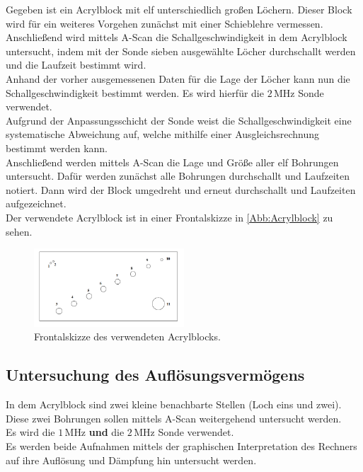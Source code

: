 Gegeben ist ein Acrylblock mit elf unterschiedlich großen Löchern.
Dieser Block wird für ein weiteres Vorgehen zunächst mit einer Schieblehre
vermessen.\\
Anschließend wird mittels A-Scan die Schallgeschwindigkeit in dem 
Acrylblock untersucht, indem mit der Sonde sieben ausgewählte Löcher
durchschallt werden und die Laufzeit bestimmt wird.\\
Anhand der vorher
ausgemessenen Daten für die Lage der Löcher kann nun die Schallgeschwindigkeit
bestimmt werden. Es wird hierfür die $2 \, \si{\mega\hertz}$ Sonde verwendet.\\
Aufgrund der Anpassungsschicht der Sonde weist die Schallgeschwindigkeit eine
systematische Abweichung auf, welche mithilfe einer Ausgleichsrechnung
bestimmt werden kann.\\
Anschließend werden mittels A-Scan die Lage und Größe aller elf Bohrungen
untersucht. Dafür werden zunächst alle Bohrungen durchschallt und Laufzeiten
notiert. Dann wird der Block umgedreht und erneut durchschallt und Laufzeiten 
aufgezeichnet.\\
Der verwendete Acrylblock ist in einer Frontalskizze in \autoref{Abb:Acrylblock} zu sehen.

\begin{figure}
    \centering
    \includegraphics[width=0.5\textwidth]{messwerte/Acrylblock.png}
    \caption{Frontalskizze des verwendeten Acrylblocks.}
    \label{Abb:Acrylblock}
\end{figure}

\subsection{Untersuchung des Auflösungsvermögens}

In dem Acrylblock sind zwei kleine benachbarte Stellen (Loch eins und zwei).
Diese zwei Bohrungen sollen mittels A-Scan weitergehend untersucht werden.\\
Es wird die $1 \, \si{\mega\hertz}$ \textbf{und} die $2 \, \si{\mega\hertz}$
Sonde verwendet.\\
Es werden beide Aufnahmen mittels der graphischen Interpretation
des Rechners auf ihre Auflösung und Dämpfung hin untersucht werden.\\

